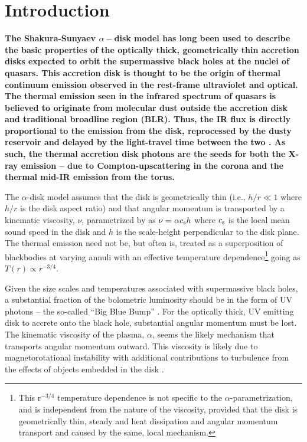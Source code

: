 \documentclass[a4paper,fleqn,usenatbib]{mnras}
\begin{document}
\section{Introduction}
{\bf 
The Shakura-Sunyaev $\alpha-$disk model \citep{SS73} has long been used to describe the basic properties of the optically thick, geometrically thin accretion disks expected to orbit the supermassive black holes at the nuclei of quasars. This accretion disk is thought to be the origin of thermal continuum emission observed in the rest-frame ultraviolet and optical. The thermal emission seen in the infrared spectrum of quasars is believed to originate from molecular dust outside the accretion disk and traditional broadline region (BLR). Thus, the IR flux is directly proportional to the emission from the disk, reprocessed by the dusty reservoir and delayed by the light-travel time between the two \citep[see e.g.,][for reviews]{Antonucci1993, Perlman2008, Lasota2016}. As such, the thermal accretion disk photons are the seeds for both the X-ray emission -- due to Compton-upscattering in the corona \citep[e.g.,][]{Begelman1983, Risaliti2009, Lusso2017} and the thermal mid-IR emission from the torus.

The $\alpha$-disk model assumes that the disk is geometrically thin (i.e., $h/r \ll 1$ where $h/r$ is the disk aspect ratio) and that angular momentum is transported by a kinematic viscosity, $\nu$, parametrized by \citet{SS73} as $\nu = \alpha c_{\rm s} h$ where $c_{\rm s}$ is the local mean sound speed in the disk and $h$ is the scale-height perpendicular to the disk plane. The thermal emission need not be, but often is, treated as a superposition of blackbodies at varying annuli with an effective temperature dependence\footnote{This r$^{-3/4}$ temperature dependence is not specific to the $\alpha$-parametrization, and is independent from the nature of the viscosity, provided that the disk is geometrically thin, steady and heat dissipation and angular momentum transport and caused by the same, local mechanism.} going as $T(r) \propto r^{-3/4}$. 

Given the size scales and temperatures associated with supermassive black holes, a substantial fraction of the bolometric luminosity should be in the form of UV photons --  the so-called ``Big Blue Bump'' \citep{Shields1978, Malkan_Sargent1982}. For the optically thick, UV emitting disk to accrete onto the black hole, substantial angular momentum must be lost.  The kinematic viscosity of the plasma, $\alpha$, seems the likely mechanism that transports angular momentum outward.  This viscosity is likely due to magnetorotational instability \citep[MRI; ][]{Balbus_Hawley1991} with additional contributions to turbulence from the effects of objects embedded in the disk \citep[e.g.,][]{McKernan2014}. 

}
\end{document}
